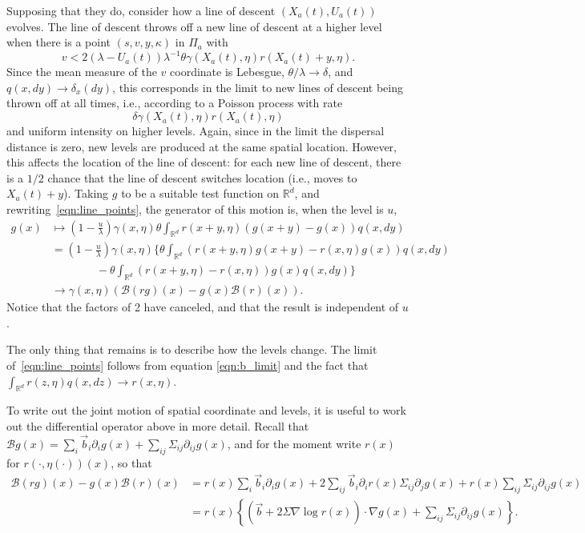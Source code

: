 \documentclass[12pt]{article}
\newcommand{\IR}{\mathbb R}
\newcommand{\grad}{\nabla}
\newcommand{\DG}{\mathcal{B}}  %
\newcommand{\meanq}{\vec b}    %
\newcommand{\covq}{\Sigma}     %
\begin{document}
Supposing that they do,
consider how a line of descent $(X_a(t), U_a(t))$ evolves.
The line of descent throws off a new line of descent at a higher level
when there is a point $(s, v, y, \kappa)$ in $\Pi_a$ with 
\begin{equation} \label{eqn:line_points}
v < 2 (\lambda - U_a(t)) \lambda^{-1} \theta \gamma(X_a(t), \eta) r(X_a(t)+y, \eta) .
\end{equation}
Since the mean measure of the $v$ coordinate is Lebesgue,
$\theta/\lambda \to \delta$,
and $q(x, dy) \to \delta_x(dy)$,
this corresponds in the limit to new lines of descent being thrown off at all times,
i.e., according to a Poisson process with rate
$$
\delta \gamma(X_a(t), \eta) r(X_a(t), \eta) 
$$
and uniform intensity on higher levels.
Again, since in the limit the dispersal distance is zero,
new levels are produced at the same spatial location.
However, this affects the location of the line of descent:
for each new line of descent, there is a $1/2$ chance
that the line of descent switches location (i.e., moves to $X_a(t) + y$).
Taking $g$ to be a suitable test function on $\IR^d$, 
and rewriting~\eqref{eqn:line_points},
the generator of this motion is, when the level is $u$,
\begin{align*}
    g(x)
    &\mapsto
    \left(1 - \frac{u}{\lambda}\right) \gamma(x, \eta)
    \theta \int_{\IR^d} r(x+y, \eta) (g(x+y) - g(x)) q(x, dy) \\
    &=
    \left(1 - \frac{u}{\lambda}\right) \gamma(x, \eta)
    \bigg\{
        \theta \int_{\IR^d} (r(x+y, \eta) g(x+y) - r(x, \eta) g(x)) q(x, dy) \\
        &\qquad \qquad {}
        -
        \theta \int_{\IR^d} (r(x+y, \eta) - r(x, \eta) ) g(x) q(x, dy) 
    \bigg\} \\
    &\to
    \gamma(x, \eta)
    \left(
        \DG(rg)(x) - g(x) \DG(r)(x)
    \right) .
\end{align*}
Notice that the factors of 2 have canceled,
and that the result is independent of $u$.

The only thing that remains is to describe how the levels change.
The limit of~\eqref{eqn:line_points} follows from
equation \eqref{eqn:b_limit} and the fact that
$\int_{\IR^d} r(z, \eta) q(x, dz) \to r(x, \eta)$.

To write out the joint motion of spatial coordinate and levels,
it is useful to work out the differential operator above in more detail.
Recall that $\DG g(x) = \sum_i \meanq_i \partial_i g(x) + \sum_{ij} \covq_{ij} \partial_{ij} g(x)$,
and for the moment write $r(x)$ for $r(\cdot, \eta(\cdot))(x)$,
so that
\begin{align*}
\DG(rg)(x) - g(x) \DG(r)(x)
    &=
    r(x) \sum_i \meanq_i \partial_i g(x)
    + 2 \sum_{ij} \meanq_i \partial_i r(x) \covq_{ij} \partial_j g(x)
    + r(x) \sum_{ij} \covq_{ij} \partial_{ij} g(x) \\
    &=
    r(x) \left\{
        \left(
        \meanq
        + 2 \covq \grad \log r(x)
        \right)
        \cdot
        \grad g(x)
        +
        \sum_{ij} \covq_{ij} \partial_{ij} g(x)
    \right\} .
\end{align*}
\end{document}
